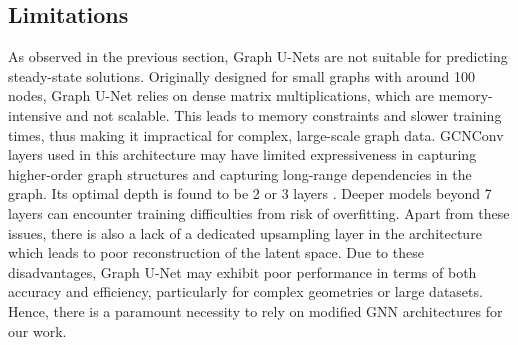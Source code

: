 \subsection{Limitations}
As observed in the previous section, Graph U-Nets are not suitable for predicting steady-state solutions. Originally designed for small graphs with around 100 nodes, Graph U-Net relies on dense matrix multiplications, which are memory-intensive and not scalable. This leads to memory constraints and slower training times, thus making it impractical for complex, large-scale graph data. GCNConv layers used in this architecture may have limited expressiveness in capturing higher-order graph structures and capturing long-range dependencies in the graph. Its optimal depth is found to be 2 or 3 layers \cite{kipf}. Deeper models beyond 7 layers can encounter training difficulties from risk of overfitting. Apart from these issues, there is also a lack of a dedicated upsampling layer in the architecture which leads to poor reconstruction of the latent space. Due to these disadvantages, Graph U-Net may exhibit poor performance in terms of both accuracy and efficiency, particularly for complex geometries or large datasets. Hence, there is a paramount necessity to rely on modified GNN architectures for our work.
